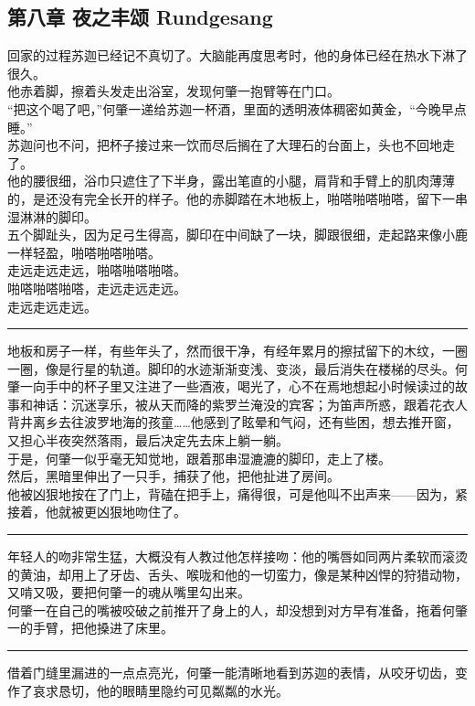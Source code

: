 \documentclass[oneside,11pt]{memoir} %
\begin{document}
\begin{CJK}{UTF8}{gbsn}
\chapter*{第八章    夜之丰颂    Rundgesang}
回家的过程苏迦已经记不真切了。大脑能再度思考时，他的身体已经在热水下淋了很久。\\\indent
    他赤着脚，擦着头发走出浴室，发现何肇一抱臂等在门口。\\\indent
    “把这个喝了吧，”何肇一递给苏迦一杯酒，里面的透明液体稠密如黄金，“今晚早点睡。”\\\indent
    苏迦问也不问，把杯子接过来一饮而尽后搁在了大理石的台面上，头也不回地走了。\\\indent
    他的腰很细，浴巾只遮住了下半身，露出笔直的小腿，肩背和手臂上的肌肉薄薄的，是还没有完全长开的样子。他的赤脚踏在木地板上，啪嗒啪嗒啪嗒，留下一串湿淋淋的脚印。\\\indent
    五个脚趾头，因为足弓生得高，脚印在中间缺了一块，脚跟很细，走起路来像小鹿一样轻盈，啪嗒啪嗒啪嗒。\\\indent
    走远走远走远，啪嗒啪嗒啪嗒。\\\indent
    啪嗒啪嗒啪嗒，走远走远走远。\\\indent
    走远走远走远。\\\indent
\rule{-3pt}{30pt}
   地板和房子一样，有些年头了，然而很干净，有经年累月的擦拭留下的木纹，一圈一圈，像是行星的轨道。脚印的水迹渐渐变浅、变淡，最后消失在楼梯的尽头。何肇一向手中的杯子里又注进了一些酒液，喝光了，心不在焉地想起小时候读过的故事和神话：沉迷享乐，被从天而降的紫罗兰淹没的宾客；为笛声所惑，跟着花衣人背井离乡去往波罗地海的孩童……他感到了眩晕和气闷，还有些困，想去推开窗，又担心半夜突然落雨，最后决定先去床上躺一躺。\\\indent
    于是，何肇一似乎毫无知觉地，跟着那串湿漉漉的脚印，走上了楼。\\\indent
    然后，黑暗里伸出了一只手，捕获了他，把他扯进了房间。\\\indent
    他被凶狠地按在了门上，背磕在把手上，痛得很，可是他叫不出声来——因为，紧接着，他就被更凶狠地吻住了。\\\indent
\rule{-3pt}{30pt}
    年轻人的吻非常生猛，大概没有人教过他怎样接吻：他的嘴唇如同两片柔软而滚烫的黄油，却用上了牙齿、舌头、喉咙和他的一切蛮力，像是某种凶悍的狩猎动物，又啃又吸，要把何肇一的魂从嘴里勾出来。\\\indent
    何肇一在自己的嘴被咬破之前推开了身上的人，却没想到对方早有准备，拖着何肇一的手臂，把他搡进了床里。\\\indent
\rule{-3pt}{30pt}
    借着门缝里漏进的一点点亮光，何肇一能清晰地看到苏迦的表情，从咬牙切齿，变作了哀求恳切，他的眼睛里隐约可见粼粼的水光。\\\indent

\end{CJK}
\end{document}
